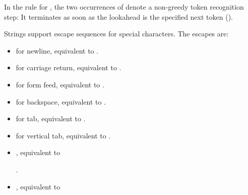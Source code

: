 \documentclass[makeidx]{article}
\begin{document}
{\LMHash{}%
In the rule for ,
the two occurrences of 
denote a non-greedy token recognition step:
It terminates as soon as the lookahead is the specified next token
().


\LMHash{}%
Strings support escape sequences for special characters.
The escapes are:
\begin{itemize}
\item
   for newline, equivalent to .
\item
   for carriage return, equivalent to .
\item
   for form feed, equivalent to .
\item
   for backspace, equivalent to .
\item
   for tab, equivalent to .
\item
   for vertical tab, equivalent to .
\item
  , equivalent to

  .
\item
  ,
  equivalent to


\end{itemize}}
\end{document}
